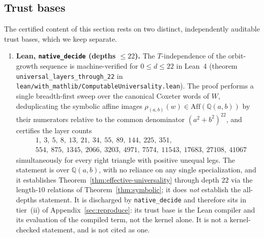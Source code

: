 \documentclass[11pt]{article}
\theoremstyle{plain}
\theoremstyle{definition}
\theoremstyle{remark}
\begin{document}
\subsection{Trust bases}

The certified content of this section rests on two distinct,
independently auditable trust bases, which we keep separate.

\begin{enumerate}[label=\textup{(\alph*)},itemsep=0.3em]
\item \textbf{Lean, \texttt{native\_decide} (depths $\le 22$).} The $T$-independence of
the orbit-growth sequence is machine-verified for $0 \le d \le 22$ in
Lean~4 (theorem \texttt{universal\_layers\_through\_22} in
\texttt{lean/with\_mathlib/ComputableUniversality.lean}). The proof
performs a single breadth-first sweep over the canonical Coxeter words
of $W$, deduplicating the symbolic affine images
$\rho_{(a,b)}(w) \in \mathrm{Aff}(\mathbb{Q}(a,b))$ by their numerators
relative to the common denominator $(a^2+b^2)^{22}$, and certifies the
layer counts
\[
\begin{aligned}
&1,\ 3,\ 5,\ 8,\ 13,\ 21,\ 34,\ 55,\ 89,\ 144,\ 225,\ 351, \\
&554,\ 875,\ 1345,\ 2066,\ 3203,\ 4971,\ 7574,\ 11543,\ 17683,\ 27108,\ 41067
\end{aligned}
\]
simultaneously for every right triangle with positive unequal legs.
The statement is over $\mathbb{Q}(a,b)$, with no reliance on any single
specialization, and it establishes
Theorem~\ref{thm:effective-universality} through depth $22$ via the
length-$10$ relations of Theorem~\ref{thm:symbolic}; it does
\emph{not} establish the all-depths statement. It is discharged by
\texttt{native\_decide} and therefore sits in tier~(ii) of
Appendix~\ref{sec:reproduce}: its trust base is the Lean compiler and its
evaluation of the compiled term, not the kernel alone. It is not a
kernel-checked statement, and is not cited as one.


\end{enumerate}
\end{document}
